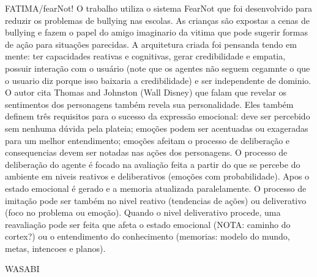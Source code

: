 {FATIMA/fearNot!}
\cite{dias2005feeling}
O trabalho utiliza o sistema FearNot que foi desenvolvido para reduzir os
problemas de bullying nas escolas. As crianças são expostas a cenas de
bullying e fazem o papel do amigo imaginario da vitima que pode sugerir formas
de ação para situações parecidas. A arquitetura criada foi pensanda tendo em
mente: ter capacidades reativas e cognitivas, gerar credibilidade e empatia,
possuir interação com o usuário (note que os agentes não seguem cegamnte o que
o usuario diz porque isso baixaria a credibilidade) e ser independente de
dominio.
%
O autor cita Thomas and Johnston (Wall Disney) que falam que revelar os
sentimentos dos personagens também revela sua personalidade. Eles também
definem três requisitos para o sucesso da expressão emocional: deve ser
percebido sem nenhuma dúvida pela plateia; emoções podem ser acentuadas ou
exageradas para um melhor entendimento;  emoções afeitam o processo de
deliberação e consequencias devem ser notadas nas ações dos personagens.
%
O processo de deliberação do agente é focado na avaliação feita a partir do
que se percebe do ambiente em niveis reativos e deliberativos (emoções com
probabilidade). Apos o estado emocional é gerado e a memoria atualizada
paralelamente. O processo de imitação pode ser também no nivel reativo
(tendencias de ações) ou deliverativo (foco no problema ou emoção). Quando o
nivel deliverativo procede, uma reavaliação pode ser feita que afeta o estado
emocional (NOTA: caminho do cortex?) ou o entendimento do conhecimento
(memorias: modelo do mundo, metas, intencoes e planos).

{WASABI} %



\cite{grimaldo2006ontology}
\cite{kshirsagar2002multilayer}
